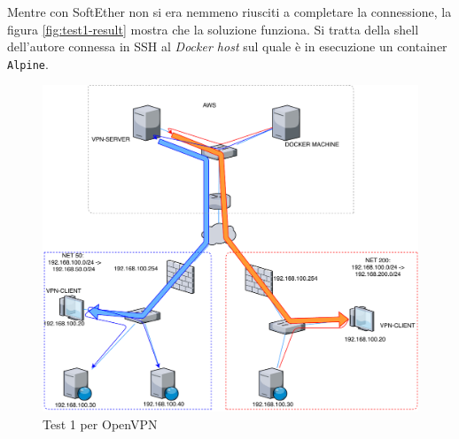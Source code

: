 Mentre con SoftEther non si era nemmeno riusciti a completare la connessione, la
figura \ref{fig:test1-result} mostra che la soluzione funziona. Si tratta della
shell dell'autore connessa in SSH al \textit{Docker host} sul quale è in esecuzione un container
\texttt{Alpine}.

\begin{figure}
	\includegraphics[scale=0.6]{img/openvpn_test1}
	\caption{Test 1 per OpenVPN}
	\label{fig:openvpn-test1}
\end{figure}

